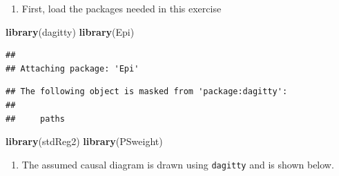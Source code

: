 \documentclass[
]{book}
\newenvironment{Shaded}{\begin{snugshade}}{\end{snugshade}}
\newcommand{\FunctionTok}[1]{\textcolor[rgb]{0.13,0.29,0.53}{\textbf{#1}}}
\newcommand{\NormalTok}[1]{#1}
\providecommand{\tightlist}{%
  \setlength{\itemsep}{0pt}\setlength{\parskip}{0pt}}
\theoremstyle{definition}
\theoremstyle{definition}
\theoremstyle{definition}
\theoremstyle{definition}
\theoremstyle{remark}
\begin{document}
\begin{enumerate}
\def\labelenumi{\arabic{enumi}.}
\tightlist
\item
  First, load the packages needed in this exercise
\end{enumerate}

\begin{Shaded}
\begin{Highlighting}[]
\FunctionTok{library}\NormalTok{(dagitty)}
\FunctionTok{library}\NormalTok{(Epi)}
\end{Highlighting}
\end{Shaded}

\begin{verbatim}
## 
## Attaching package: 'Epi'
\end{verbatim}

\begin{verbatim}
## The following object is masked from 'package:dagitty':
## 
##     paths
\end{verbatim}

\begin{Shaded}
\begin{Highlighting}[]
\FunctionTok{library}\NormalTok{(stdReg2)}
\FunctionTok{library}\NormalTok{(PSweight)}
\end{Highlighting}
\end{Shaded}

\begin{enumerate}
\def\labelenumi{\arabic{enumi}.}
\setcounter{enumi}{1}
\tightlist
\item
  The assumed causal diagram is drawn using \texttt{dagitty} and is shown
  below.
\end{enumerate}
\end{document}
